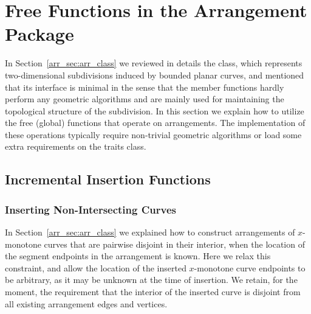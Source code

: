 \section{Free Functions in the Arrangement Package}
\label{arr_sec:gl_funcs}

In Section~\ref{arr_sec:arr_class} we reviewed in details the
 class, which represents two-dimensional
subdivisions induced by bounded planar curves, and mentioned that its
interface is minimal in the sense that the member functions hardly
perform any geometric algorithms and are mainly used for
maintaining the topological structure of the subdivision. In this
section we explain how to utilize the free (global) functions that operate
on arrangements. The implementation of these operations typically require
non-trivial geometric algorithms or load some extra requirements on
the traits class.

\subsection{Incremental Insertion Functions}
\label{arr_ssec:inc_insert}

\subsubsection{Inserting Non-Intersecting Curves}
\label{arr_sssec:insert_non_x}

In Section~\ref{arr_sec:arr_class} we explained how to construct
arrangements of $x$-monotone curves that are pairwise disjoint in
their interior, when the location of the segment endpoints in the
arrangement is known. Here we relax this constraint, and allow the
location of the inserted $x$-monotone curve endpoints to be arbitrary,
as it may be unknown at the time of insertion. We retain, for the moment,
the requirement that the interior of the inserted curve is disjoint from
all existing arrangement edges and vertices.

